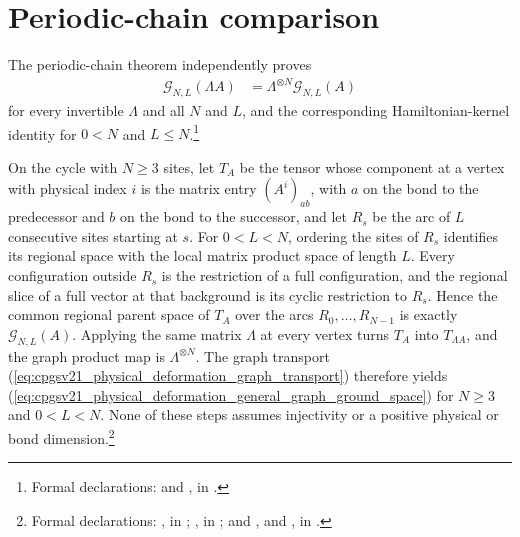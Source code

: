 \documentclass{article}
\begin{document}
\section{Periodic-chain comparison}

The periodic-chain theorem independently proves
\begin{align}\label{eq:cpgsv21_physical_deformation_general_graph_ground_space}
    \mathcal G_{N,L}(\Lambda A) & = \Lambda^{\otimes N}\mathcal G_{N,L}(A)
\end{align}
for every invertible $\Lambda$ and all $N$ and $L$, and the corresponding
Hamiltonian-kernel identity for $0<N$ and $L\le N$.\footnote{Formal
    declarations:  and
    , in
    .}

On the cycle with $N\ge3$ sites, let $T_A$ be the tensor whose component at a
vertex with physical index $i$ is the matrix entry $(A^i)_{ab}$, with $a$ on
the bond to the predecessor and $b$ on the bond to the successor, and let
$R_s$ be the arc of $L$ consecutive sites starting at $s$. For $0<L<N$,
ordering the sites of $R_s$ identifies its regional space with the local
matrix product space of length $L$. Every configuration outside $R_s$ is the restriction of a full
configuration, and the regional slice of a full vector at that background is
its cyclic restriction to $R_s$. Hence the common regional parent space of
$T_A$ over the arcs $R_0,\ldots,R_{N-1}$ is exactly $\mathcal G_{N,L}(A)$.
Applying the same matrix $\Lambda$ at every vertex turns $T_A$ into
$T_{\Lambda A}$, and the graph product map is $\Lambda^{\otimes N}$. The graph
transport (\ref{eq:cpgsv21_physical_deformation_graph_transport}) therefore
yields (\ref{eq:cpgsv21_physical_deformation_general_graph_ground_space}) for
$N\ge3$ and $0<L<N$. None of these steps assumes injectivity or a positive
physical or bond dimension.\footnote{Formal declarations:
    , in
    ;
    , in
    ; and
    ,
     and
    , in
    .}
\end{document}

